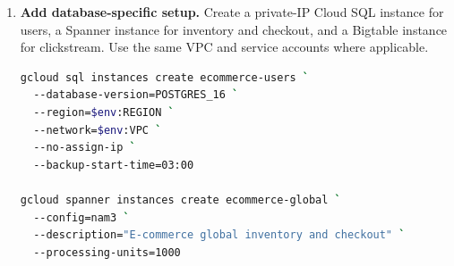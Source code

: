 \begin{enumerate}
\begin{lstlisting}[language=Python,caption={Writing a Bigtable clickstream event with a salted reversed-timestamp row key.}]
import hashlib
import os
import time
import uuid

from google.cloud import bigtable


PROJECT_ID = os.environ["PROJECT_ID"]
INSTANCE_ID = os.environ.get("BIGTABLE_INSTANCE", "ecommerce-clicks")
TABLE_ID = os.environ.get("BIGTABLE_TABLE", "clickstream")
MAX_TS = 9999999999999


def bucket_for(user_id: str, buckets: int = 32) -> str:
    digest = hashlib.sha256(user_id.encode("utf-8")).hexdigest()
    return f"{int(digest[:4], 16) % buckets:02d}"


def row_key(user_id: str, session_id: str, event_ms: int) -> bytes:
    reverse_ms = MAX_TS - event_ms
    return f"{bucket_for(user_id)}#{user_id}#{session_id}#{reverse_ms:013d}".encode("utf-8")


def main() -> None:
    client = bigtable.Client(project=PROJECT_ID, admin=True)
    table = client.instance(INSTANCE_ID).table(TABLE_ID)
    user_id = "user-123"
    session_id = "session-456"
    event_ms = int(time.time() * 1000)
    row = table.direct_row(row_key(user_id, session_id, event_ms))
    row.set_cell("event", "event_id", str(uuid.uuid4()))
    row.set_cell("event", "type", "product_view")
    row.set_cell("event", "product_id", "sku-00042")
    row.set_cell("event", "event_ms", str(event_ms))
    row.commit()
    print({"status": "written", "user_id": user_id, "session_id": session_id})


if __name__ == "__main__":
    main()
\end{lstlisting}

    \item \textbf{Add database-specific setup.} Create a private-IP Cloud SQL instance for users, a Spanner instance for inventory and checkout, and a Bigtable instance for clickstream. Use the same VPC and service accounts where applicable.

\begin{lstlisting}[language=bash,caption={Representative Cloud SQL, Spanner, and Bigtable creation commands for the capstone.}]
gcloud sql instances create ecommerce-users `
  --database-version=POSTGRES_16 `
  --region=$env:REGION `
  --network=$env:VPC `
  --no-assign-ip `
  --backup-start-time=03:00

gcloud spanner instances create ecommerce-global `
  --config=nam3 `
  --description="E-commerce global inventory and checkout" `
  --processing-units=1000


\end{lstlisting}
\end{enumerate}
